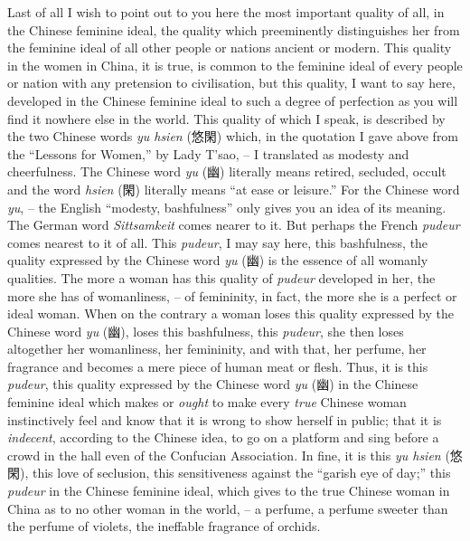 Last of all I wish to point out to you here the most important quality of all,
in the Chinese feminine ideal, the quality which preeminently distinguishes her from the feminine ideal of all other people or nations ancient or modern.
This quality in the women in China, it is true, is common to the feminine ideal of every people or nation with any pretension to civilisation,
but this quality, I want to say here, developed in the Chinese feminine ideal to such a degree of perfection as you will find it nowhere else in the world.
This quality of which I speak, is described by the two Chinese words \emph{yu hsien} (悠閑)
which, in the quotation I gave above from the ``Lessons for Women,'' by Lady T'sao,
-- I translated as modesty and cheerfulness.
The Chinese word \emph{yu} (幽) literally means retired, secluded, occult and the word \emph{hsien} (閑) literally means ``at ease or leisure.''
For the Chinese word \emph{yu},
-- the English ``modesty, bashfulness'' only gives you an idea of its meaning.
The German word \emph{Sittsamkeit} comes nearer to it. But perhaps the French \emph{pudeur} comes nearest to it of all.
This \emph{pudeur}, I may say here, this bashfulness, the quality expressed by the Chinese word \emph{yu} (幽) is the essence of all womanly qualities.
The more a woman has this quality of \emph{pudeur} developed in her,
the more she has of womanliness,
-- of femininity, in fact, the more she is a perfect or ideal woman.
When on the contrary a woman loses this quality expressed by the Chinese word \emph{yu} (幽),
loses this bashfulness, this \emph{pudeur}, she then loses altogether her womanliness, her femininity,
and with that, her perfume, her fragrance and becomes a mere piece of human meat or flesh.
Thus, it is this \emph{pudeur}, this quality expressed by the Chinese word \emph{yu} (幽) in the Chinese feminine ideal
which makes or \emph{ought} to make every \emph{true} Chinese woman instinctively feel and know that it is wrong to show herself in public;
that it is \emph{indecent}, according to the Chinese idea,
to go on a platform and sing before a crowd in the hall even of the Confucian Association.
In fine, it is this \emph{yu hsien} (悠閑), this love of seclusion, this sensitiveness against the ``garish eye of day;''
this \emph{pudeur} in the Chinese feminine ideal,
which gives to the true Chinese woman in China as to no other woman in the world,
-- a perfume, a perfume sweeter than the perfume of violets, the ineffable fragrance of orchids.

